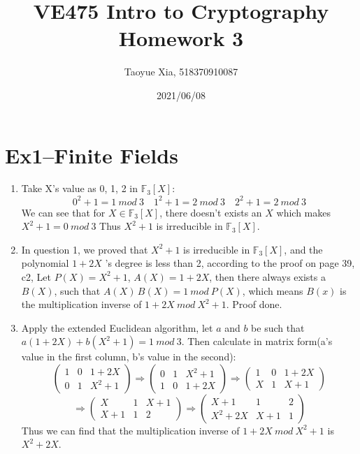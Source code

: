 \documentclass[12pt, a4paper]{article}
\begin{document}
\title{VE475 Intro to Cryptography Homework 3}
\author{Taoyue Xia, 518370910087}
\date{2021/06/08}
\maketitle

\section{Ex1--Finite Fields}
\begin{enumerate}
    \item Take X's value as 0, 1, 2 in $\mathbb{F}_3[X]$:
          $$0^2 + 1 = 1\ mod\ 3 \quad 1^2 + 1 = 2\ mod\ 3 \quad 2^2 + 1 = 2\ mod\ 3$$
          We can see that for $X \in \mathbb{F}_3[X]$, there doesn't exists an $X$ which makes $X^2 + 1 = 0\ mod\ 3$\newline
          Thus $X^2 + 1$ is irreducible in $\mathbb{F}_3[X]$.
    \item In question 1, we proved that $X^2 + 1$ is irreducible in $\mathbb{F}_3[X]$, 
          and the polynomial $1 + 2X$ 's degree is less than 2, according to the proof on page 39, c2, 
          Let $P(X) = X^2 + 1$, $A(X) = 1 + 2X$, then there always exists a $B(X)$, such that
          $A(X)\, B(X) = 1\ mod\ P(X)$, which means $B(x)$ is the multiplication inverse of $1 + 2X\ mod\ X^2 + 1$. 
          Proof done.
    \item Apply the extended Euclidean algorithm, let $a$ and $b$ be such that $a(1 + 2X) + b(X^2 + 1) = 1\ mod\ 3$.
          Then calculate in matrix form(a's value in the first column, b's value in the second):\newline
          $$
          \begin{pmatrix} 1 & 0 & 1 + 2X\\ 0 & 1 & X^2 + 1 \end{pmatrix}
          \Rightarrow \begin{pmatrix} 0 & 1 & X^2 + 1\\ 1 & 0 & 1 + 2X \end{pmatrix}
          \Rightarrow \begin{pmatrix} 1 & 0 & 1 + 2X\\ X & 1 & X + 1 \end{pmatrix}
          $$
          $$
          \Rightarrow \begin{pmatrix} X & 1 & X + 1\\ X + 1 & 1 & 2 \end{pmatrix}
          \Rightarrow \begin{pmatrix} X + 1 & 1 & 2\\ X^2 + 2X & X + 1 & 1 \end{pmatrix}
          $$
          Thus we can find that the multiplication inverse of $1 + 2X\ mod\ X^2 + 1$ is $X^2 + 2X$.

\end{enumerate}
\end{document}
